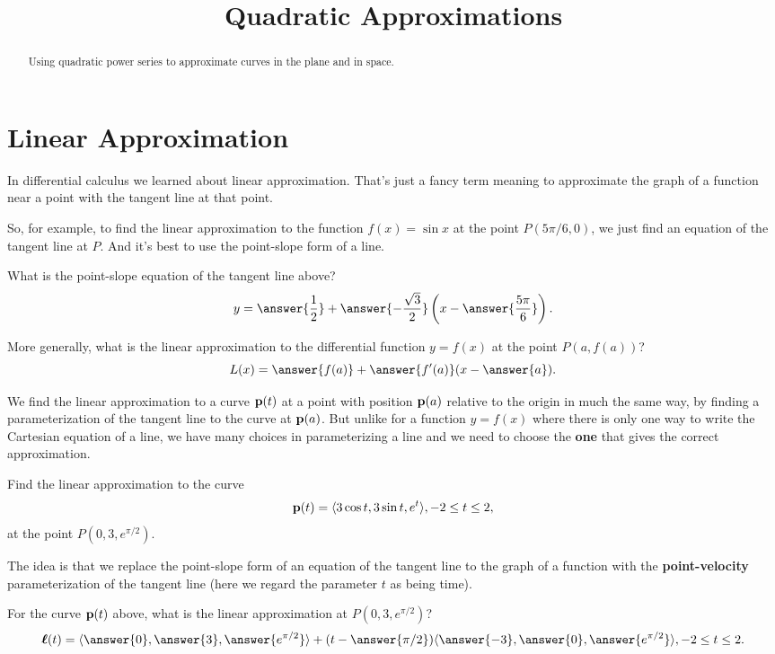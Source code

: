 \documentclass{ximera}
\title{Quadratic Approximations}
\begin{document}
\begin{abstract}
Using quadratic power series to approximate curves in the plane and in space.
\end{abstract}
\maketitle

\section{Linear Approximation}
In differential calculus we learned about linear approximation. That's just a fancy term meaning to approximate the graph of a function near a point with the tangent line at that point.

So, for example, to find the linear approximation to the function $f(x) = \sin x$ at the point $P(5\pi/6,0)$, we just find an equation of the tangent line at $P$. And it's best to use the point-slope form of a line.

\begin{question}  \label{Qegbygyyu}
What is the point-slope equation of the tangent line above?
\[
    y = \answer{\frac{1}{2}} + \answer{-\frac{\sqrt{3}}{2}}\left( x - \answer{\frac{5\pi}{6}}  \right) .
\]
\end{question}

\begin{question}   \label{Qt43666}
More generally, what is the linear approximation to the differential function $y=f(x)$ at the point $P(a,f(a))$?
\[
     L(x) = \answer{f(a)} + \answer{f^\prime(a)} (x - \answer{a} ) .
\]
\end{question}


We find the linear approximation to a curve ${\bf p}(t)$ at a point with position ${\bf p}(a)$ relative to the origin in much the same way, by finding a parameterization of the tangent line to the curve at ${\bf p}(a)$. But unlike for a function $y=f(x)$ where there is only one way to write the Cartesian equation of a line, we have many choices in parameterizing a line and we need to choose the {\bf one} that gives the correct approximation. 

\begin{question}   \label{Qggkuthds}
Find the linear approximation to the curve
\[
   {\bf p}(t) = \langle 3 \cos t, 3\sin t, e^t \rangle, -2\leq t \leq 2 ,
\]
at the point $P(0,3,e^{\pi/2})$.

The idea is that we replace the point-slope form of an equation of the tangent line to the graph of a function with the {\bf point-velocity} parameterization of the tangent line (here we regard the parameter $t$ as being time).

For the curve ${\bf p}(t)$ above, what is the linear approximation at $P(0,3,e^{\pi/2})$?
\[
   \boldsymbol{\ell}(t) = \langle  \answer{0}, \answer{3}  , \answer{e^{\pi/2}}  \rangle  + (t - \answer{\pi/2}) \langle \answer{-3}, \answer{0}, \answer{e^{\pi/2}}  \rangle , -2\leq t \leq 2 .
\]
\end{question}
\end{document}
